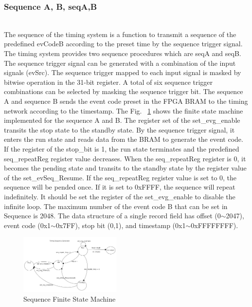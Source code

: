 \documentclass[journal,reqno]{IEEEtran}
\begin{document}
\subsubsection{Sequence A, B, seqA,B}\hspace*{\fill} \\
The sequence of the timing system is a function to transmit a sequence of the predefined evCodeB according to the preset time by the sequence trigger signal. The timing system provides two sequence procedures which are seqA and seqB. The sequence trigger signal can be generated with a combination of the input signals (evSrc). The sequence trigger mapped to each input signal is masked  by bitwise operation in the 31-bit register. A total of six sequence trigger combinations can be selected by masking the sequence trigger bit. The sequence A and sequence B sends the event code preset in the FPGA BRAM to the timing network according to the timestamp. The Fig. ~\ref*{sequence_fsm} shows the finite state machine implemented for the sequence A and B. The register set of the set\_evg\_enable transits the stop state to the standby state. By the sequence trigger signal, it enters the run state and reads data from the BRAM to generate the event code. If the register of the stop\_bit is 1, the run state terminates and the predefined seq\_repeatReg register value decreases. When the seq\_repeatReg register is 0, it becomes the pending state and transits to the standby state by the register value of the set\_evSeq\_Resume. If the seq\_repeatReg register value is set to 0, the sequence will be pended once. If it is set to 0xFFFF, the sequence will repeat indefinitely. It should be set the register of the set\_evg\_enable to disable the infinite loop. The maximum number of the event code B that can be set in Sequence is 2048. The data structure of a single record field has offset (0$\sim$2047), event code (0x1$\sim$0x7FF), stop bit (0,1), and timestamp (0x1$\sim$0xFFFFFFFF).

\begin{figure}[!htb]
	\centering
	\includegraphics*[width=0.45\textwidth, height=0.35\textwidth]{img17.png}
	\caption{Sequence Finite State Machine}
	\label{sequence_fsm}
\end{figure}
\end{document}

